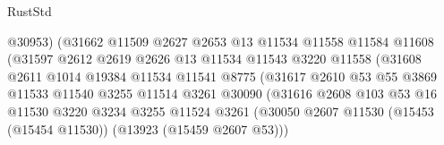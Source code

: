 \begin{lexlean}{RustStd}
\begin{coremodule}
                                      @30953)
                                    (@31662
                                      @11509
                                      @2627
                                      @2653
                                      @13
                                      @11534
                                      @11558
                                      @11584
                                      @11608
                                      (@31597
                                        @2612
                                        @2619
                                        @2626
                                        @13
                                        @11534
                                        @11543
                                        @3220
                                        @11558
                                        (@31608
                                          @2611
                                          @1014
                                          @19384
                                          @11534
                                          @11541
                                          @8775
                                          (@31617
                                            @2610
                                            @53
                                            @55
                                            @3869
                                            @11533
                                            @11540
                                            @3255
                                            @11514
                                            @3261
                                            @30090
                                            (@31616
                                              @2608
                                              @103
                                              @53
                                              @16
                                              @11530
                                              @3220
                                              @3234
                                              @3255
                                              @11524
                                              @3261
                                              (@30050
                                                @2607
                                                @11530
                                                (@15453 (@15454 @11530))
                                                (@13923 (@15459 @2607 @53)))

\end{coremodule}
\end{lexlean}
